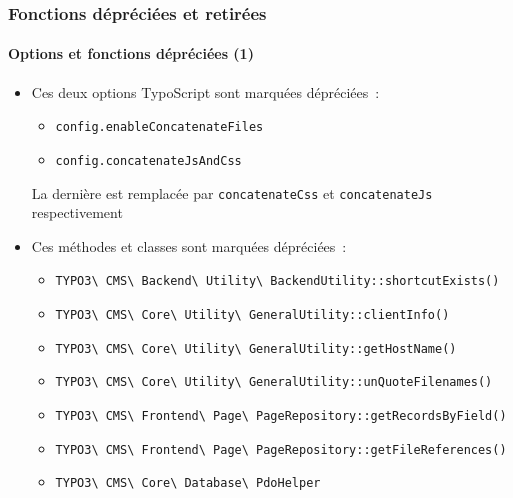 \begin{frame}[fragile]
	\frametitle{Fonctions dépréciées et retirées}
	\framesubtitle{Options et fonctions dépréciées (1)}

	\begin{itemize}
		\item Ces deux options TypoScript sont marquées dépréciées~:

			\begin{itemize}\smaller
                \item \texttt{config.enableConcatenateFiles}
                \item \texttt{config.concatenateJsAndCss}
            \end{itemize}

        	\smaller
				La dernière est remplacée par \texttt{concatenateCss} et
					\texttt{concatenateJs} respectivement
			\normalsize

		\item Ces méthodes et classes sont marquées dépréciées~:

			\begin{itemize}\smaller
				\item \texttt{TYPO3\textbackslash
					CMS\textbackslash
					Backend\textbackslash
					Utility\textbackslash
					BackendUtility::shortcutExists()}

				\item \texttt{TYPO3\textbackslash
					CMS\textbackslash
					Core\textbackslash
					Utility\textbackslash
					GeneralUtility::clientInfo()}

				\item \texttt{TYPO3\textbackslash
					CMS\textbackslash
					Core\textbackslash
					Utility\textbackslash
					GeneralUtility::getHostName()}

				\item \texttt{TYPO3\textbackslash
					CMS\textbackslash
					Core\textbackslash
					Utility\textbackslash
					GeneralUtility::unQuoteFilenames()}

				\item \texttt{TYPO3\textbackslash
					CMS\textbackslash
					Frontend\textbackslash
					Page\textbackslash
					PageRepository::getRecordsByField()}

				\item \texttt{TYPO3\textbackslash
					CMS\textbackslash
					Frontend\textbackslash
					Page\textbackslash
					PageRepository::getFileReferences()}

				\item \texttt{TYPO3\textbackslash
					CMS\textbackslash
					Core\textbackslash
					Database\textbackslash
					PdoHelper}

			\end{itemize}
	\end{itemize}

\end{frame}

